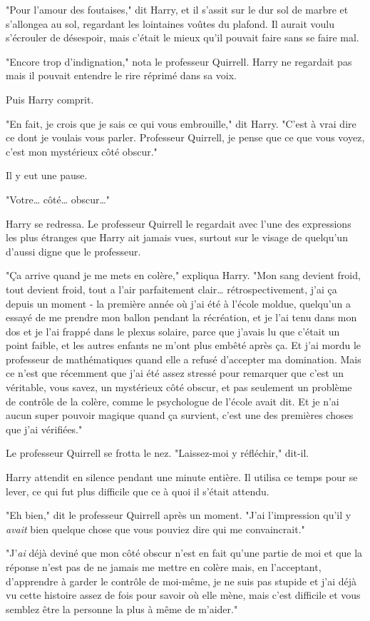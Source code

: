 "Pour l'amour des foutaises," dit Harry, et il s'assit sur le dur sol de marbre et s'allongea au sol, regardant les lointaines voûtes du plafond. Il aurait voulu s'écrouler de désespoir, mais c'était le mieux qu'il pouvait faire sans se faire mal.

"Encore trop d'indignation," nota le professeur Quirrell. Harry ne regardait pas mais il pouvait entendre le rire réprimé dans sa voix.

Puis Harry comprit.

"En fait, je crois que je sais ce qui vous embrouille," dit Harry. "C'est à vrai dire ce dont je voulais vous parler. Professeur Quirrell, je pense que ce que vous voyez, c'est mon mystérieux côté obscur."

Il y eut une pause.

"Votre… côté… obscur…"

Harry se redressa. Le professeur Quirrell le regardait avec l'une des expressions les plus étranges que Harry ait jamais vues, surtout sur le visage de quelqu'un d'aussi digne que le professeur.

"Ça arrive quand je me mets en colère," expliqua Harry. "Mon sang devient froid, tout devient froid, tout a l'air parfaitement clair… rétrospectivement, j'ai ça depuis un moment - la première année où j'ai été à l'école moldue, quelqu'un a essayé de me prendre mon ballon pendant la récréation, et je l'ai tenu dans mon dos et je l'ai frappé dans le plexus solaire, parce que j'avais lu que c'était un point faible, et les autres enfants ne m'ont plus embêté après ça. Et j'ai mordu le professeur de mathématiques quand elle a refusé d'accepter ma domination. Mais ce n'est que récemment que j'ai été assez stressé pour remarquer que c'est un véritable, vous savez, un mystérieux côté obscur, et pas seulement un problème de contrôle de la colère, comme le psychologue de l'école avait dit. Et je n'ai aucun super pouvoir magique quand ça survient, c'est une des premières choses que j'ai vérifiées."

Le professeur Quirrell se frotta le nez. "Laissez-moi y réfléchir," dit-il.

Harry attendit en silence pendant une minute entière. Il utilisa ce temps pour se lever, ce qui fut plus difficile que ce à quoi il s'était attendu.

"Eh bien," dit le professeur Quirrell après un moment. "J'ai l'impression qu'il y \emph{avait} bien quelque chose que vous pouviez dire qui me convaincrait."

"J'\emph{ai} déjà deviné que mon côté obscur n'est en fait qu'une partie de moi et que la réponse n'est pas de ne jamais me mettre en colère mais, en l'acceptant, d'apprendre à garder le contrôle de moi-même, je ne suis pas stupide et j'ai déjà vu cette histoire assez de fois pour savoir où elle mène, mais c'est difficile et vous semblez être la personne la plus à même de m'aider."

